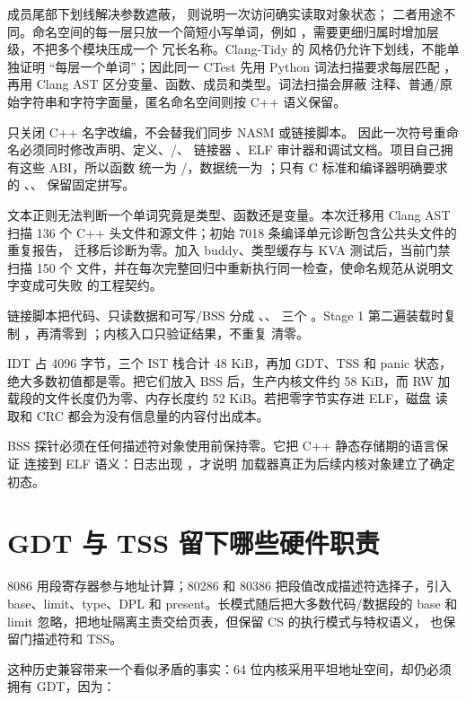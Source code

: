成员尾部下划线解决参数遮蔽， 则说明一次访问确实读取对象状态；
二者用途不同。命名空间的每一层只放一个简短小写单词，例如
，需要更细归属时增加层级，不把多个模块压成一个
冗长名称。Clang-Tidy 的  风格仍允许下划线，不能单独证明
“每层一个单词”；因此同一 CTest 先用 Python 词法扫描要求每层匹配
\code{[a-z]+}，再用 Clang AST 区分变量、函数、成员和类型。词法扫描会屏蔽
注释、普通/原始字符串和字符字面量，匿名命名空间则按 C++ 语义保留。

 只关闭 C++ 名字改编，不会替我们同步 NASM 或链接脚本。
因此一次符号重命名必须同时修改声明、定义、/、
链接器 、ELF 审计器和调试文档。项目自己拥有这些 ABI，所以函数
统一为 /，数据统一为
；只有 C 标准和编译器明确要求的
、、 保留固定拼写。

文本正则无法判断一个单词究竟是类型、函数还是变量。本次迁移用 Clang AST 扫描
136 个 C++ 头文件和源文件；初始 7018 条编译单元诊断包含公共头文件的重复报告，
迁移后诊断为零。加入 buddy、类型缓存与 KVA 测试后，当前门禁扫描 150 个
文件，并在每次完整回归中重新执行同一检查，使命名规范从说明文字变成可失败
的工程契约。

链接脚本把代码、只读数据和可写/BSS 分成 、、
 三个 。Stage 1 第二遍装载时复制
，再清零到 ；内核入口只验证结果，不重复
清零。

IDT 占 4096 字节，三个 IST 栈合计 48 KiB，再加 GDT、TSS 和 panic 状态，
绝大多数初值都是零。把它们放入 BSS 后，生产内核文件约 58 KiB，而 RW
加载段的文件长度仍为零、内存长度约 52 KiB。若把零字节实存进 ELF，磁盘
读取和 CRC 都会为没有信息量的内容付出成本。

BSS 探针必须在任何描述符对象使用前保持零。它把 C++ 静态存储期的语言保证
连接到 ELF  语义：日志出现 ，才说明
加载器真正为后续内核对象建立了确定初态。

\section{GDT 与 TSS 留下哪些硬件职责}
8086 用段寄存器参与地址计算；80286 和 80386 把段值改成描述符选择子，引入
base、limit、type、DPL 和 present。长模式随后把大多数代码/数据段的 base
和 limit 忽略，把地址隔离主责交给页表，但保留 CS 的执行模式与特权语义，
也保留门描述符和 TSS。

这种历史兼容带来一个看似矛盾的事实：64 位内核采用平坦地址空间，却仍必须
拥有 GDT，因为：

